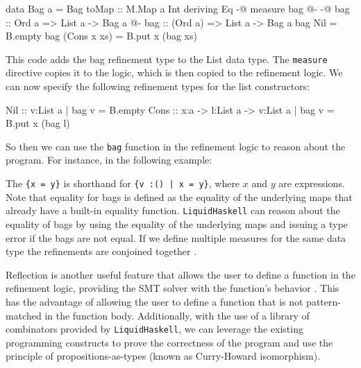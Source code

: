 \documentclass[]{rptuseminar}
\begin{document}
\begin{haskell}
data Bag a = Bag { toMap :: M.Map a Int } deriving Eq
{-@ measure bag @-}
{-@ bag :: Ord a => List a -> Bag a @-}
bag :: (Ord a) => List a -> Bag a
bag Nil = B.empty
bag (Cons x xs) = B.put x (bag xs)
\end{haskell}

This code adds the bag refinement type to the List data type. 
The \texttt{measure} directive copies it to the logic,
which is then copied to the refinement logic. We can now specify the following refinement types for the list constructors:

\begin{haskell}
Nil  :: {v:List a | bag v = B.empty}
Cons :: x:a -> l:List a -> {v:List a | bag v = B.put x (bag l)}
\end{haskell}

So then we can use the \texttt{bag} function in the refinement logic to reason about the program. 
For instance, in the following example:


The \texttt{\{x = y\}} is shorthand for \texttt{\{v :() | x = y\}}, where $x$ and $y$ are expressions.
Note that equality for bags is defined as the equality of the underlying maps that already have a built-in equality function.
\texttt{LiquidHaskell} can reason about the equality of bags by using the equality of the underlying maps and issuing a type error if the bags are not equal.
If we define multiple measures for the same data type the refinements are conjoined together \cite{niki_lecture_2024}.



Reflection is another useful feature that allows the user to define a function in the refinement logic, providing
the SMT solver with the function's behavior \cite{vazou_refinement_2018}. 
This has the advantage of allowing the user to define a function that is not pattern-matched in the function body.
Additionally, with the use of a library of combinators provided by \texttt{LiquidHaskell}, we can leverage the existing programming constructs to 
prove the correctness of the program and use the principle of propositions-as-types (known as Curry-Howard isomorphism)\cite{vazou_refinement_2018}\cite{wadler_propositions_2015}.
\end{document}
